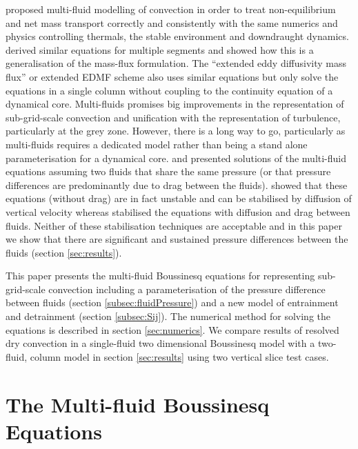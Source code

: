 \documentclass[draft]{agujournal2019}
\begin{document}
 proposed multi-fluid modelling of convection in order
to treat non-equilibrium and net mass transport correctly and consistently
with the same numerics and physics controlling thermals, the stable
environment and downdraught dynamics.  derived similar
equations for multiple segments and showed how this is a generalisation
of the mass-flux formulation. The  ``extended eddy
diffusivity mass flux'' or extended EDMF scheme also uses similar
equations but 
{only solve the equations in a single column without coupling to the continuity equation of a dynamical core.}
Multi-fluids promises big improvements
in the representation of sub-grid-scale convection and unification
with the representation of turbulence, particularly at the grey zone.
However, there is a long way to go, particularly as multi-fluids requires
a dedicated model rather than being a stand alone parameterisation
for a dynamical core.  and  presented solutions
of the multi-fluid equations assuming two fluids that share the same
pressure (or that pressure differences are predominantly due to drag
between the fluids).  showed that these equations (without
drag) are in fact unstable and can be stabilised by diffusion of vertical
velocity whereas  stabilised the equations with diffusion
and drag between fluids. Neither of these stabilisation techniques
are acceptable and in this paper we show that there are significant
and sustained pressure differences between the fluids (section \ref{sec:results}). 

This paper presents the multi-fluid Boussinesq equations for representing
sub-grid-scale convection including a parameterisation of the pressure
difference between fluids (section \ref{subsec:fluidPressure}) and
a new model of entrainment and detrainment (section \ref{subsec:Sij}).
The numerical method for solving the equations is described in section
\ref{sec:numerics}. We compare results of resolved dry convection
in a single-fluid two dimensional Boussinesq model with a two-fluid,
 column model in section \ref{sec:results} using two vertical
slice test cases.

\section{The Multi-fluid Boussinesq Equations}
\end{document}
